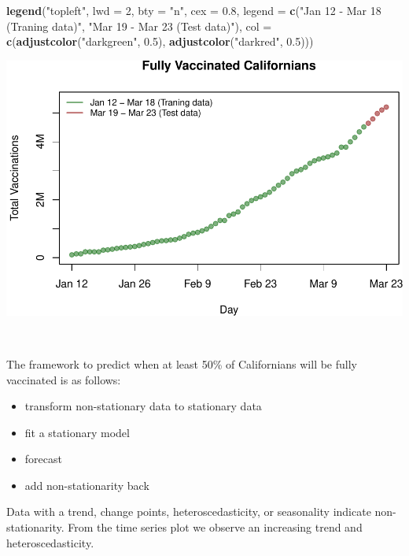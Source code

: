 \documentclass[]{article}
\newenvironment{Shaded}{\begin{snugshade}}{\end{snugshade}}
\newcommand{\DataTypeTok}[1]{\textcolor[rgb]{0.13,0.29,0.53}{#1}}
\newcommand{\DecValTok}[1]{\textcolor[rgb]{0.00,0.00,0.81}{#1}}
\newcommand{\FloatTok}[1]{\textcolor[rgb]{0.00,0.00,0.81}{#1}}
\newcommand{\KeywordTok}[1]{\textcolor[rgb]{0.13,0.29,0.53}{\textbf{#1}}}
\newcommand{\NormalTok}[1]{#1}
\newcommand{\StringTok}[1]{\textcolor[rgb]{0.31,0.60,0.02}{#1}}
\providecommand{\tightlist}{%
  \setlength{\itemsep}{0pt}\setlength{\parskip}{0pt}}
\begin{document}
\begin{Shaded}
\begin{Highlighting}[]
\KeywordTok{legend}\NormalTok{(}\StringTok{"topleft"}\NormalTok{,}
       \DataTypeTok{lwd =} \DecValTok{2}\NormalTok{,}
       \DataTypeTok{bty =} \StringTok{"n"}\NormalTok{,}
       \DataTypeTok{cex =} \FloatTok{0.8}\NormalTok{,}
       \DataTypeTok{legend =} \KeywordTok{c}\NormalTok{(}\StringTok{"Jan 12 - Mar 18 (Traning data)"}\NormalTok{,}
                  \StringTok{"Mar 19 - Mar 23 (Test data)"}\NormalTok{),}
       \DataTypeTok{col =} \KeywordTok{c}\NormalTok{(}\KeywordTok{adjustcolor}\NormalTok{(}\StringTok{"darkgreen"}\NormalTok{, }\FloatTok{0.5}\NormalTok{),}
               \KeywordTok{adjustcolor}\NormalTok{(}\StringTok{"darkred"}\NormalTok{, }\FloatTok{0.5}\NormalTok{)))}
\end{Highlighting}
\end{Shaded}

\begin{center}\includegraphics{Q5_files/figure-latex/unnamed-chunk-4-1} \end{center}

\(\;\)

The framework to predict when at least 50\% of Californians will be
fully vaccinated is as follows:

\begin{itemize}
\tightlist
\item
  transform non-stationary data to stationary data
\item
  fit a stationary model
\item
  forecast
\item
  add non-stationarity back
\end{itemize}

Data with a trend, change points, heteroscedasticity, or seasonality
indicate non-stationarity. From the time series plot we observe an
increasing trend and heteroscedasticity.
\end{document}
